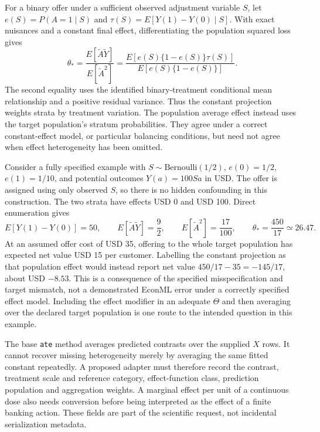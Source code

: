 For a binary offer under a sufficient observed adjustment variable $S$, let
$e(S)=P(A=1\mid S)$ and $\tau(S)=E[Y(1)-Y(0)\mid S]$. With exact
nuisances and a constant final effect, differentiating the population squared
loss gives
\begin{equation}
 \theta_*=
 \frac{E[\widetilde A\widetilde Y]}{E[\widetilde A^2]}
 =\frac{E[e(S)\{1-e(S)\}\tau(S)]}
        {E[e(S)\{1-e(S)\}]}.
 \label{exec19:econml-projection}
\end{equation}
The second equality uses the identified binary-treatment conditional mean
relationship and a positive residual variance. Thus the constant projection
weights strata by treatment variation. The population average effect instead
uses the target population's stratum probabilities. They agree under a
correct constant-effect model, or particular balancing conditions, but need
not agree when effect heterogeneity has been omitted.
\citep{exec19_econml_reference}

Consider a fully specified example with $S\sim\mathrm{Bernoulli}(1/2)$,
$e(0)=1/2$, $e(1)=1/10$, and potential outcomes $Y(a)=100Sa$ in USD.
The offer is assigned using only observed $S$, so there is no hidden
confounding in this construction. The two strata have effects USD 0 and
USD 100. Direct enumeration gives
\begin{equation}
 E[Y(1)-Y(0)]=50,\qquad
 E[\widetilde A\widetilde Y]=\frac92,\qquad
 E[\widetilde A^2]=\frac{17}{100},\qquad
 \theta_*=\frac{450}{17}\simeq26.47.
 \label{exec19:econml-money}
\end{equation}
At an assumed offer cost of USD 35, offering to the whole target population
has expected net value USD 15 per customer. Labelling the constant projection
as that population effect would instead report net value
$450/17-35=-145/17$, about USD $-8.53$. This is a consequence of the
specified misspecification and target mismatch, not a demonstrated EconML
error under a correctly specified effect model. Including the effect modifier
in an adequate $\Theta$ and then averaging over the declared target population
is one route to the intended question in this example.
\citep{exec19_econml_reference}

The base \texttt{ate} method averages predicted contrasts over the supplied
$X$ rows. It cannot recover missing heterogeneity merely by averaging the
same fitted constant repeatedly. A proposed adapter must therefore record
the contrast, treatment scale and reference category, effect-function class,
prediction population and aggregation weights. A marginal effect per unit
of a continuous dose also needs conversion before being interpreted as the
effect of a finite banking action. These fields are part of the scientific
request, not incidental serialization metadata.~\citep{exec19_econml_source}

